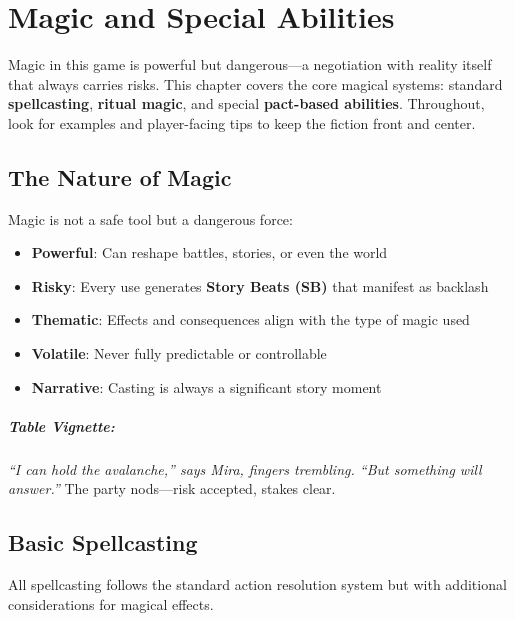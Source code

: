 \chapter{Magic and Special Abilities} \label{ch:magic}

Magic in this game is powerful but dangerous—a negotiation with reality itself that always carries risks. This chapter covers the core magical systems: standard \textbf{spellcasting}, \textbf{ritual magic}, and special \textbf{pact-based abilities}. Throughout, look for examples and player-facing tips to keep the fiction front and center.

\section{The Nature of Magic} 

Magic is not a safe tool but a dangerous force:
\begin{itemize}
\item \textbf{Powerful}: Can reshape battles, stories, or even the world
\item \textbf{Risky}: Every use generates \textbf{Story Beats (SB)} that manifest as backlash
\item \textbf{Thematic}: Effects and consequences align with the type of magic used
\item \textbf{Volatile}: Never fully predictable or controllable
\item \textbf{Narrative}: Casting is always a significant story moment
\end{itemize}

\paragraph{Table Vignette:}
\emph{``I can hold the avalanche,'' says Mira, fingers trembling. ``But something will answer.''} The party nods—risk accepted, stakes clear.

\section{Basic Spellcasting} 

All spellcasting follows the standard action resolution system but with additional considerations for magical effects.

